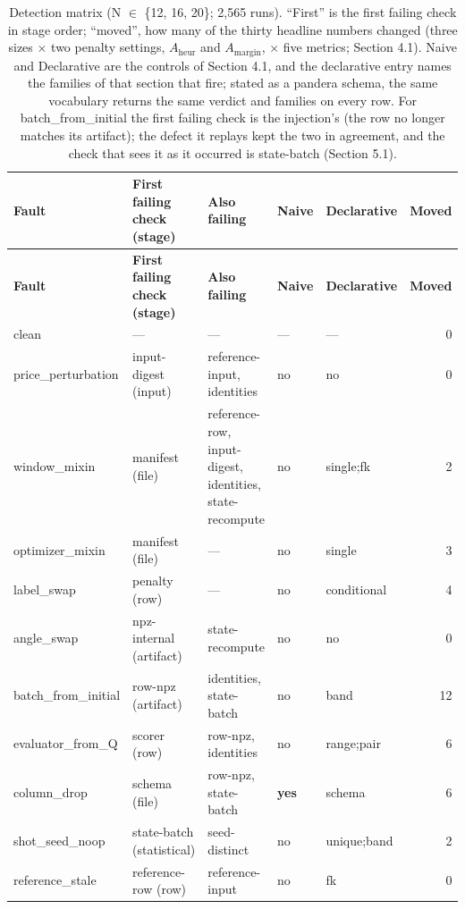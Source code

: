 \documentclass[acmsmall,screen,review]{acmart}
\begin{document}
\begingroup
\small
\setlength\LTleft{\fill}
\setlength\LTright{\fill}
\begin{xltabular}{\textwidth}{>{\hsize}Y>{\hsize}Y>{\hsize}Yllr}
\caption{Detection matrix (N $\in$ \{12, 16, 20\}; 2,565 runs). ``First'' is the first failing check in stage order; ``moved'', how many of the thirty headline numbers changed (three sizes $\times$ two penalty settings, $A_{\mathrm{heur}}$ and $A_{\mathrm{margin}}$, $\times$ five metrics; Section 4.1). Naive and Declarative are the controls of Section 4.1, and the declarative entry names the families of that section that fire; stated as a pandera schema, the same vocabulary returns the same verdict and families on every row. For batch\_from\_initial the first failing check is the injection's (the row no longer matches its artifact); the defect it replays kept the two in agreement, and the check that sees it as it occurred is state-batch (Section 5.1).}\label{tab:3} \\
\toprule
\textbf{Fault} & \textbf{First failing check (stage)} & \textbf{Also failing} & \textbf{Naive} & \textbf{Declarative} & \textbf{Moved} \\
\midrule
\endfirsthead
\toprule
\textbf{Fault} & \textbf{First failing check (stage)} & \textbf{Also failing} & \textbf{Naive} & \textbf{Declarative} & \textbf{Moved} \\
\midrule
\endhead
\endfoot
\bottomrule
\endlastfoot
clean & --- & --- & --- & --- & 0 \\*
price\_perturbation & input-digest (input) & reference-input, identities & no & no & 0 \\*
window\_mixin & manifest (file) & reference-row, input-digest, identities, state-recompute & no & single;fk & 2 \\*
optimizer\_mixin & manifest (file) & --- & no & single & 3 \\*
label\_swap & penalty (row) & --- & no & conditional & 4 \\*
angle\_swap & npz-internal (artifact) & state-recompute & no & no & 0 \\*
batch\_from\_initial & row-npz (artifact) & identities, state-batch & no & band & 12 \\*
evaluator\_from\_Q & scorer (row) & row-npz, identities & no & range;pair & 6 \\*
column\_drop & schema (file) & row-npz, state-batch & \textbf{yes} & schema & 6 \\*
shot\_seed\_noop & state-batch (statistical) & seed-distinct & no & unique;band & 2 \\*
reference\_stale & reference-row (row) & reference-input & no & fk & 0 \\
\end{xltabular}
\endgroup
\end{document}
